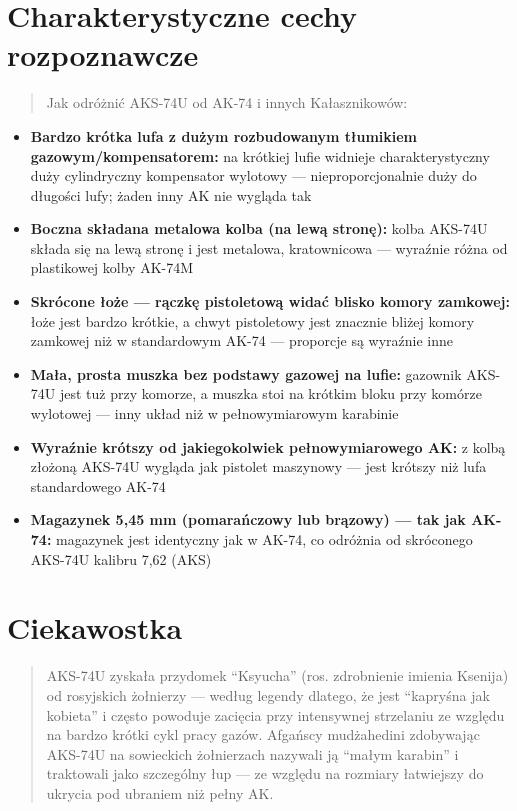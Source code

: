 \documentclass[12pt,openany,oneside]{book}
\providecommand{\tightlist}{%
  \setlength{\itemsep}{0pt}\setlength{\parskip}{0pt}}
\begin{document}
\section{Charakterystyczne cechy
rozpoznawcze}\label{charakterystyczne-cechy-rozpoznawcze-45}

\begin{quote}
Jak odróżnić AKS-74U od AK-74 i innych Kałasznikowów:
\end{quote}

\begin{itemize}
\tightlist
\item
  \textbf{Bardzo krótka lufa z dużym rozbudowanym tłumikiem
  gazowym/kompensatorem:} na krótkiej lufie widnieje charakterystyczny
  duży cylindryczny kompensator wylotowy --- nieproporcjonalnie duży do
  długości lufy; żaden inny AK nie wygląda tak
\item
  \textbf{Boczna składana metalowa kolba (na lewą stronę):} kolba
  AKS-74U składa się na lewą stronę i jest metalowa, kratownicowa ---
  wyraźnie różna od plastikowej kolby AK-74M
\item
  \textbf{Skrócone łoże --- rączkę pistoletową widać blisko komory
  zamkowej:} łoże jest bardzo krótkie, a chwyt pistoletowy jest znacznie
  bliżej komory zamkowej niż w standardowym AK-74 --- proporcje są
  wyraźnie inne
\item
  \textbf{Mała, prosta muszka bez podstawy gazowej na lufie:} gazownik
  AKS-74U jest tuż przy komorze, a muszka stoi na krótkim bloku przy
  komórze wylotowej --- inny układ niż w pełnowymiarowym karabinie
\item
  \textbf{Wyraźnie krótszy od jakiegokolwiek pełnowymiarowego AK:} z
  kolbą złożoną AKS-74U wygląda jak pistolet maszynowy --- jest krótszy
  niż lufa standardowego AK-74
\item
  \textbf{Magazynek 5,45 mm (pomarańczowy lub brązowy) --- tak jak
  AK-74:} magazynek jest identyczny jak w AK-74, co odróżnia od
  skróconego AKS-74U kalibru 7,62 (AKS)
\end{itemize}

\section{Ciekawostka}\label{ciekawostka-45}

\begin{quote}
AKS-74U zyskała przydomek ``Ksyucha'' (ros. zdrobnienie imienia Ksenija)
od rosyjskich żołnierzy --- według legendy dlatego, że jest ``kapryśna
jak kobieta'' i często powoduje zacięcia przy intensywnej strzelaniu ze
względu na bardzo krótki cykl pracy gazów. Afgańscy mudżahedini
zdobywając AKS-74U na sowieckich żołnierzach nazywali ją ``małym
karabin'' i traktowali jako szczególny łup --- ze względu na rozmiary
łatwiejszy do ukrycia pod ubraniem niż pełny AK.
\end{quote}
\end{document}
